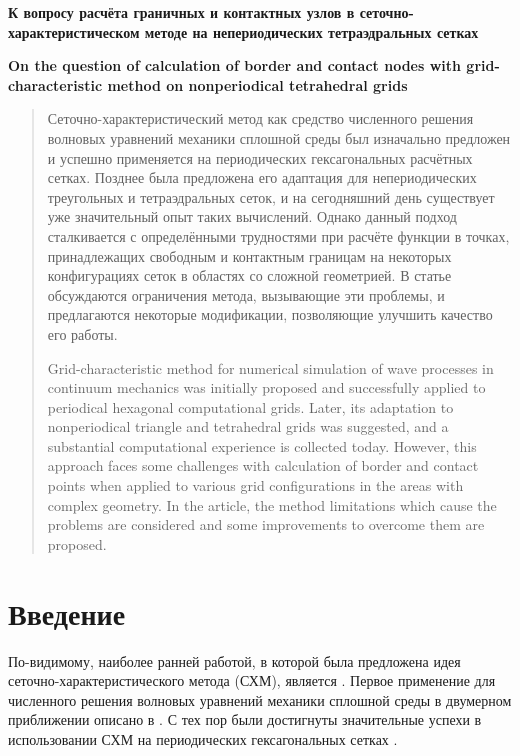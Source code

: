 \documentclass[a4paper]{article}
\numberwithin{equation}{section}
\begin{document}
\begin{center}
	\Large\textbf{{{К вопросу расчёта граничных и контактных узлов 
	в сеточно-характеристическом методе на непериодических тетраэдральных сетках}}}
	
	\Large\textbf{{{On the question of calculation of border and contact nodes with  
	grid-characteristic method on nonperiodical tetrahedral grids}}}
\end{center}

\begin{abstract}
Сеточно-характеристический метод как средство численного решения волновых уравнений 
механики сплошной среды был изначально предложен и успешно применяется на периодических 
гексагональных расчётных сетках. 
Позднее была предложена его адаптация для 
непериодических треугольных и тетраэдральных сеток, 
и на сегодняшний день существует уже значительный опыт таких вычислений. 
Однако данный подход сталкивается с определёнными трудностями 
при расчёте функции в точках, принадлежащих свободным и контактным границам 
на некоторых конфигурациях сеток в областях со сложной геометрией. 
В статье обсуждаются ограничения метода, вызывающие эти проблемы, и 
предлагаются некоторые модификации, позволяющие улучшить качество его работы. 

Grid-characteristic method for numerical simulation of wave processes in continuum 
mechanics was initially proposed and successfully applied to periodical hexagonal 
computational grids. 
Later, its adaptation to nonperiodical triangle and tetrahedral grids 
was suggested, and a substantial computational experience is collected today. 
However, this approach faces some challenges 
with calculation of border and contact points 
when applied to various grid configurations in the areas with complex geometry. 
In the article, the method limitations which cause the problems are considered 
and some improvements to overcome them are proposed. 
\end{abstract}


\section{Введение}
По-видимому, наиболее ранней работой, в которой была предложена идея 
сеточно-характери\-стического метода (СХМ), является \cite{magomedov_kholodov_1969}. 
Первое применение для численного решения волновых уравнений 
механики сплошной среды в двумерном приближении описано в \cite{petrov_kholodov}. 
С тех пор были достигнуты значительные успехи в использовании СХМ на периодических 
гексагональных сетках \cite{golubev_khokhlov_15, golubev_khokhlov_16, gcm_for_seismic}. 
\end{document}
